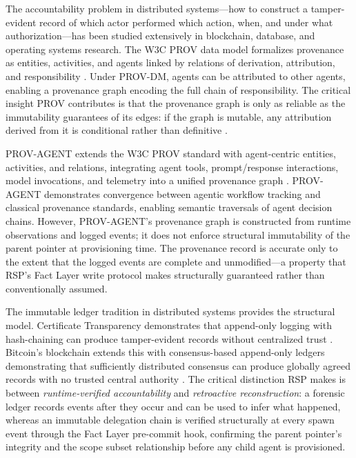 The accountability problem in distributed systems---how to construct a tamper-evident record of which actor performed which action, when, and under what authorization---has been studied extensively in blockchain, database, and operating systems research. The W3C PROV data model formalizes provenance as entities, activities, and agents linked by relations of derivation, attribution, and responsibility \cite{moreau2015-prov}. Under PROV-DM, agents can be attributed to other agents, enabling a provenance graph encoding the full chain of responsibility. The critical insight PROV contributes is that the provenance graph is only as reliable as the immutability guarantees of its edges: if the graph is mutable, any attribution derived from it is conditional rather than definitive \cite{moreau2015-prov}.

PROV-AGENT extends the W3C PROV standard with agent-centric entities, activities, and relations, integrating agent tools, prompt/response interactions, model invocations, and telemetry into a unified provenance graph \cite{prov-agent2025}. PROV-AGENT demonstrates convergence between agentic workflow tracking and classical provenance standards, enabling semantic traversals of agent decision chains. However, PROV-AGENT's provenance graph is constructed from runtime observations and logged events; it does not enforce structural immutability of the parent pointer at provisioning time. The provenance record is accurate only to the extent that the logged events are complete and unmodified---a property that RSP's Fact Layer write protocol makes structurally guaranteed rather than conventionally assumed.

The immutable ledger tradition in distributed systems provides the structural model. Certificate Transparency demonstrates that append-only logging with hash-chaining can produce tamper-evident records without centralized trust \cite{laurie2013certificate}. Bitcoin's blockchain extends this with consensus-based append-only ledgers demonstrating that sufficiently distributed consensus can produce globally agreed records with no trusted central authority \cite{nakamoto2008bitcoin}. The critical distinction RSP makes is between \emph{runtime-verified accountability} and \emph{retroactive reconstruction}: a forensic ledger records events after they occur and can be used to infer what happened, whereas an immutable delegation chain is verified structurally at every spawn event through the Fact Layer pre-commit hook, confirming the parent pointer's integrity and the scope subset relationship before any child agent is provisioned.

